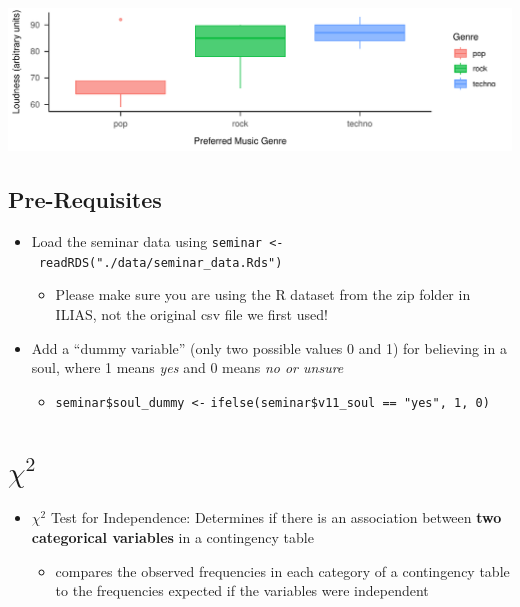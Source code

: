 \documentclass[
]{book}
\providecommand{\tightlist}{%
  \setlength{\itemsep}{0pt}\setlength{\parskip}{0pt}}
\begin{document}
\includegraphics{_main_files/figure-latex/unnamed-chunk-55-1.pdf}

\subsection{Pre-Requisites}\label{pre-requisites}

\begin{itemize}
\tightlist
\item
  Load the seminar data using \texttt{seminar\ \textless{}-\ readRDS("./data/seminar\_data.Rds")}

  \begin{itemize}
  \tightlist
  \item
    Please make sure you are using the R dataset from the
    zip folder in ILIAS, not the original csv file we first used!
  \end{itemize}
\item
  Add a ``dummy variable'' (only two possible values 0 and 1)
  for believing in a soul, where 1 means \emph{yes} and 0 means \emph{no or unsure}

  \begin{itemize}
  \tightlist
  \item
    \texttt{seminar\$soul\_dummy\ \textless{}-}
    \texttt{ifelse(seminar\$v11\_soul\ ==\ "yes",\ 1,\ 0)}
  \end{itemize}
\end{itemize}

\section{\texorpdfstring{\(\chi^2\)}{\textbackslash chi\^{}2}}\label{chi2}

\begin{itemize}
\tightlist
\item
  \(\chi^2\) Test for Independence: Determines if there is an association between \textbf{two categorical variables} in a contingency table

  \begin{itemize}
  \tightlist
  \item
    compares the observed frequencies in each category of a contingency table to the frequencies expected if the variables were independent
  \end{itemize}
\end{itemize}
\end{document}
